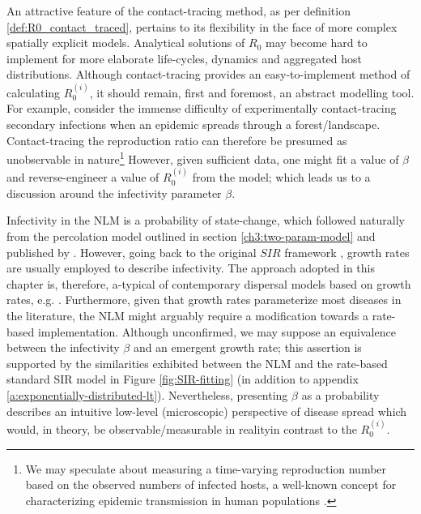 An attractive feature of the contact-tracing method, as per definition \ref{def:R0_contact_traced}, 
pertains to its flexibility in the face of more complex spatially explicit models.
Analytical solutions of $R_0$ may become hard to implement for more elaborate life-cycles, dynamics and aggregated host distributions.
Although contact-tracing provides an easy-to-implement method of calculating $R_0^{(i)}$, it should remain, first and foremost, an abstract modelling tool.
For example, consider the immense difficulty of experimentally contact-tracing secondary infections when an epidemic spreads through a forest/landscape.
Contact-tracing the reproduction ratio can therefore be presumed as unobservable in nature\footnote{
We may speculate about measuring a time-varying reproduction number based on the observed numbers of infected hosts,
a well-known concept for characterizing epidemic transmission in human populations \cite{thompson2019improved}.}
However, given sufficient data, one might fit a value of $\beta$ and reverse-engineer a value of $R_0^{(i)}$ from the model;
which leads us to a discussion around the infectivity parameter $\beta$.

Infectivity in the NLM is a probability of state-change, which followed naturally from the percolation model outlined in section \ref{ch3:two-param-model} and published by \cite{OROZCOFUENTES201912}.
However, going back to the original $SIR$ framework \cite{kermack-model}, growth rates are usually employed to describe infectivity.
The approach adopted in this chapter is, therefore, a-typical of contemporary dispersal models based on growth rates, e.g. \cite{fabre2021optimising, control-theory, white2017modelling, large-scale-control}.
Furthermore, given that growth rates parameterize most diseases in the literature, the NLM might arguably require a modification towards a rate-based implementation.
Although unconfirmed, we may suppose an equivalence between the infectivity $\beta$ and an emergent growth rate; this assertion is supported by the similarities exhibited between the NLM and the rate-based standard SIR model in Figure \ref{fig:SIR-fitting} (in addition to appendix \ref{a:exponentially-distributed-lt}).
Nevertheless, presenting $\beta$ as a probability describes an intuitive low-level (microscopic) perspective of disease spread which would, 
in theory, be observable/measurable in reality\textemdash in contrast to the $R_0^{(i)}$.

\newpage

